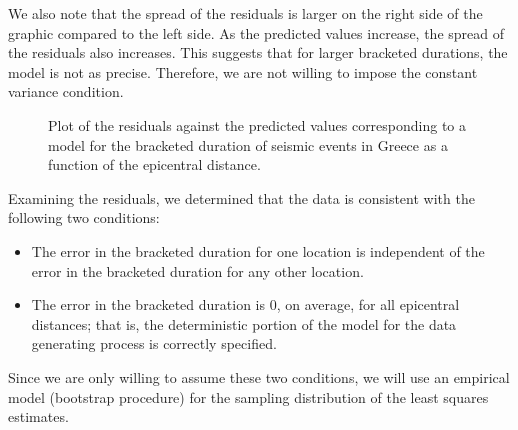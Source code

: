 \documentclass[
  letterpaper,
  DIV=11,
  numbers=noendperiod]{scrreprt}
\providecommand{\tightlist}{%
  \setlength{\itemsep}{0pt}\setlength{\parskip}{0pt}}\usepackage{longtable,booktabs,array}
\theoremstyle{plain}
\theoremstyle{definition}
\theoremstyle{definition}
\theoremstyle{remark}
\begin{document}
We also note that the spread of the residuals is larger on the right
side of the graphic compared to the left side. As the predicted values
increase, the spread of the residuals also increases. This suggests that
for larger bracketed durations, the model is not as precise. Therefore,
we are not willing to impose the constant variance condition.

\begin{figure}


\caption{\label{fig-regrecap-mean0}Plot of the residuals against the
predicted values corresponding to a model for the bracketed duration of
seismic events in Greece as a function of the epicentral distance.}

\end{figure}%

Examining the residuals, we determined that the data is consistent with
the following two conditions:

\begin{itemize}
\tightlist
\item
  The error in the bracketed duration for one location is independent of
  the error in the bracketed duration for any other location.
\item
  The error in the bracketed duration is 0, on average, for all
  epicentral distances; that is, the deterministic portion of the model
  for the data generating process is correctly specified.
\end{itemize}

Since we are only willing to assume these two conditions, we will use an
empirical model (bootstrap procedure) for the sampling distribution of
the least squares estimates.
\end{document}
